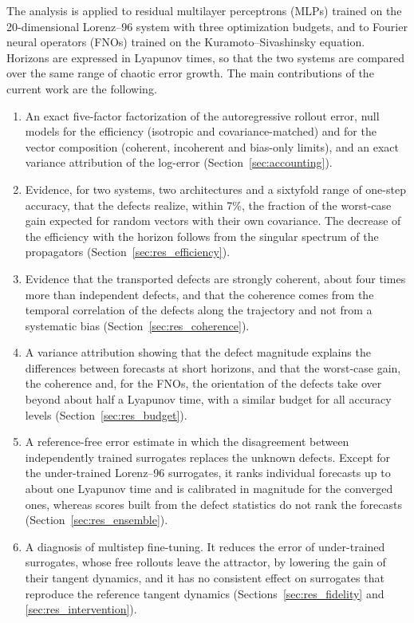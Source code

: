 The analysis is applied to residual multilayer perceptrons (MLPs) trained on the 20-dimensional Lorenz--96 system with three optimization budgets, and to Fourier neural operators (FNOs) trained on the Kuramoto--Sivashinsky equation. Horizons are expressed in Lyapunov times, so that the two systems are compared over the same range of chaotic error growth. The main contributions of the current work are the following.
\begin{enumerate}
\item An exact five-factor factorization of the autoregressive rollout error, null models for the efficiency (isotropic and covariance-matched) and for the vector composition (coherent, incoherent and bias-only limits), and an exact variance attribution of the log-error (Section~\ref{sec:accounting}).
\item Evidence, for two systems, two architectures and a sixtyfold range of one-step accuracy, that the defects realize, within 7\%, the fraction of the worst-case gain expected for random vectors with their own covariance. The decrease of the efficiency with the horizon follows from the singular spectrum of the propagators (Section~\ref{sec:res_efficiency}).
\item Evidence that the transported defects are strongly coherent, about four times more than independent defects, and that the coherence comes from the temporal correlation of the defects along the trajectory and not from a systematic bias (Section~\ref{sec:res_coherence}).
\item A variance attribution showing that the defect magnitude explains the differences between forecasts at short horizons, and that the worst-case gain, the coherence and, for the FNOs, the orientation of the defects take over beyond about half a Lyapunov time, with a similar budget for all accuracy levels (Section~\ref{sec:res_budget}).
\item A reference-free error estimate in which the disagreement between independently trained surrogates replaces the unknown defects. Except for the under-trained Lorenz--96 surrogates, it ranks individual forecasts up to about one Lyapunov time and is calibrated in magnitude for the converged ones, whereas scores built from the defect statistics do not rank the forecasts (Section~\ref{sec:res_ensemble}).
\item A diagnosis of multistep fine-tuning. It reduces the error of under-trained surrogates, whose free rollouts leave the attractor, by lowering the gain of their tangent dynamics, and it has no consistent effect on surrogates that reproduce the reference tangent dynamics (Sections~\ref{sec:res_fidelity} and \ref{sec:res_intervention}).
\end{enumerate}
